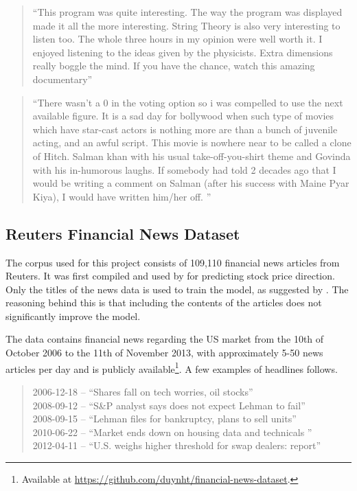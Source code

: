 \begin{quote}
    ``This program was quite interesting. The way the program was displayed made it all the more interesting. String Theory is also very interesting to listen too. The whole three hours in my opinion were well worth it. I enjoyed listening to the ideas given by the physicists. Extra dimensions really boggle the mind. If you have the chance, watch this amazing documentary'' 
\end{quote}
\begin{quote}
    ``There wasn't a 0 in the voting option so i was compelled to use the next available figure. It is a sad day for bollywood when such type of movies which have star-cast actors is nothing more are than a bunch of juvenile acting, and an awful script. This movie is nowhere near to be called a clone of Hitch. Salman khan with his usual take-off-you-shirt theme and Govinda with his in-humorous laughs. If somebody had told 2 decades ago that I would be writing a comment on Salman (after his success with Maine Pyar Kiya), I would have written him/her off. ''
\end{quote}

\subsection{Reuters Financial News Dataset}

The corpus used for this project consists of 109,110 financial news articles from Reuters. It was first compiled and used by \citet{ding2014using} for predicting stock price direction. Only the titles of the news data is used to train the model, as suggested by \citet{ding2014using}. The reasoning behind this is that including the contents of the articles does not significantly improve the model. 

The data contains financial news regarding the US market from the 10th of October 2006 to the 11th of November 2013, with approximately 5-50 news articles per day and is publicly available\footnote{Available at \url{https://github.com/duynht/financial-news-dataset}.}. A few examples of headlines follows. 

\begin{quote}
    2006-12-18 -- ``Shares fall on tech worries, oil stocks'' \\
    2008-09-12 -- ``S\&P analyst says does not expect Lehman to fail'' \\
    2008-09-15 -- ``Lehman files for bankruptcy, plans to sell units'' \\ 
    2010-06-22 -- ``Market ends down on housing data and technicals '' \\
    2012-04-11 -- ``U.S. weighs higher threshold for swap dealers: report'' \\
\end{quote}


